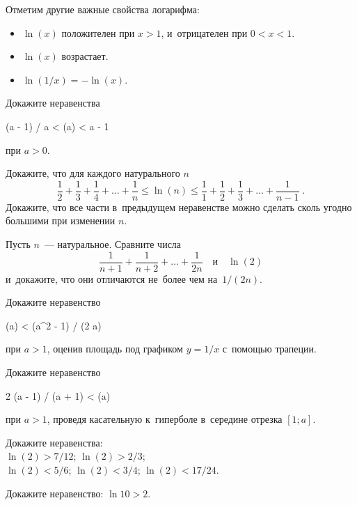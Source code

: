 Отметим другие важные свойства логарифма:
\begin{itemize}
\item
$\ln(x)$ положителен при $x > 1$, и~отрицателен при $0 < x < 1$.
\item
$\ln(x)$ возрастает.
\item
$\ln(1/x) = - \ln(x)$.
\end{itemize}

\begin{problems}

\item
Докажите неравенства
\begin{problemeq*}
    (a - 1) / a < \ln(a) < a - 1
\end{problemeq*}
при $a > 0$.

\item
\subproblem
Докажите, что для каждого натурального $n$
\[
    \frac{1}{2} + \frac{1}{3} + \frac{1}{4} + \ldots + \frac{1}{n}
\leq
    \ln(n)
\leq
    \frac{1}{1} + \frac{1}{2} + \frac{1}{3} + \ldots + \frac{1}{n-1}
\; . \]
\subproblem
Докажите, что все части в~предыдущем неравенстве можно сделать сколь угодно
большими при изменении $n$.

\item
Пусть $n$~--- натуральное.
Сравните числа
\[
    \frac{1}{n+1} + \frac{1}{n+2} + \ldots + \frac{1}{2 n}
\quad\text{и}\quad
    \ln(2)
\]
и~докажите, что они отличаются не~более чем на~$1 / (2 n)$.

\item
Докажите неравенство
\begin{problemeq*}
    \ln(a) < (a^2 - 1) / (2 a)
\end{problemeq*}
при $a > 1$,
оценив площадь под графиком $y = 1 / x$ с~помощью трапеции.

\item
Докажите неравенство
\begin{problemeq*}
    2 (a - 1) / (a + 1) < \ln(a)
\end{problemeq*}
при $a > 1$,
проведя касательную к~гиперболе в~середине отрезка $[1; a]$.

\item
Докажите неравенства:
\\[0.3ex]
\subproblem $\ln(2) > 7 / 12$;
\qquad
\subproblem $\ln(2) > 2 / 3$;
\\[0.5ex]
\subproblem $\ln(2) < 5 / 6$;
\qquad
\subproblem $\ln(2) < 3 / 4$;
\qquad
\subproblem $\ln(2) < 17 / 24$.

\item
Докажите неравенство: $\ln 10 > 2$.


\end{problems}
